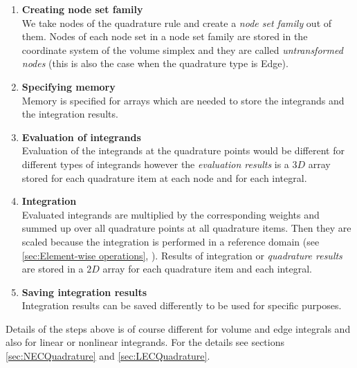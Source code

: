 \documentclass[BoSSSForSolvingConservationLaws.tex]{subfiles}
\begin{document}
\begin{enumerate}
\item \textbf{Creating node set family}\\
We take nodes of the quadrature rule and create a \emph{node set family} out of them. Nodes of each node set in a node set family are stored in the coordinate system of the volume simplex and they are called \emph{untransformed nodes} (this is also the case when the quadrature type is Edge).
\item \textbf{Specifying memory}\\
Memory is specified for arrays which are needed to store the integrands and the integration results.
\item \textbf{Evaluation of integrands}\\
Evaluation of the integrands at the quadrature points would be different for different types of integrands however the \emph{evaluation results} is a $3D$ array stored for each quadrature item at each node and for each integral.
\item \textbf{Integration}\\
Evaluated integrands are multiplied by the corresponding weights and summed up over all quadrature points at all quadrature items. Then they are scaled because the integration is performed in a reference domain (see \ref{sec:Element-wise operations}, ). Results of integration or \emph{quadrature results} are stored in a $2D$ array for each quadrature item and each integral.
\item \textbf{Saving integration results}\\
Integration results can be saved differently to be used for specific purposes.
\end{enumerate}

Details of the steps above is of course different for volume and edge integrals and also for linear or nonlinear integrands. For the details see sections \ref{sec:NECQuadrature} and \ref{sec:LECQuadrature}.
\end{document}
